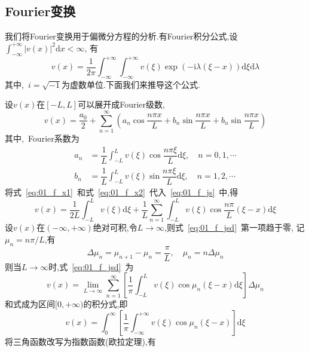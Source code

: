 \documentclass[a4paper,cs4size,adobefonts,fancyhdr]{ctexart}[2005/11/25]
\newcommand{\upcite}[1]{\textsuperscript{\textsuperscript{\cite{#1}}}}
\newcommand{\dif}{\mathrm{d}}
\newcommand*{\mi}{\ensuremath{\mathrm{i}}}        %
\begin{document}
\subsection{Fourier变换}
我们将Fourier变换用于偏微分方程的分析.有Fourier积分公式\upcite{同济大学.计算数学教研室2009},设$\int_{-\infty}^{+\infty}\left|v(x)\right|^2\dif x<\infty$,
有
\begin{equation}\label{eq:01_f}
 v(x)=\dfrac{1}{2\pi}\int_{-\infty}^{+\infty}\int_{-\infty}^{+\infty} v(\xi)\exp(-\mi\lambda(\xi-x))
 \dif\xi\dif\lambda
\end{equation}
其中,~$i=\sqrt{-1}$为虚数单位.下面我们来推导这个公式.\par
设$v(x)$在$[-L,L]$可以展开成Fourier级数,
\begin{equation}\label{eq:01_f_js}
 v(x)=\dfrac{a_0}{2}+\sum_{n=1}^{\infty}\left(a_n\cos\dfrac{n\pi x}{L}+
 b_n\sin\dfrac{n\pi x}{L}+b_n\sin\dfrac{n\pi x}{L}\right)
\end{equation}
其中,~Fourier系数为
\begin{align}
 a_n &=\dfrac{1}{L}\int_{-L}^{L} v(\xi)\cos\dfrac{n\pi\xi}{L}\dif \xi,\quad n=0,1,\cdots \label{eq:01_f_x1}\\
 b_n &=\dfrac{1}{L}\int_{-L}^{L} v(\xi)\sin\dfrac{n\pi\xi}{L}\dif \xi,\quad n=1,2,\cdots \label{eq:01_f_x2}
\end{align}
将式~\eqref{eq:01_f_x1}~和式~\eqref{eq:01_f_x2}~代入~\eqref{eq:01_f_js}~中,得
\begin{equation}\label{eq:01_f_jsd}
 v(x)=\dfrac{1}{2L}\int_{-L}^{L} v(\xi)\dif \xi + \dfrac{1}{L}\sum_{n=1}^{\infty}
      \int_{-L}^{L} v(\xi)\cos\dfrac{n\pi}{L}(\xi-x)\dif\xi
\end{equation}
设$v(x)$在$(-\infty,+\infty)$绝对可积,令$L\to\infty$,则式~\eqref{eq:01_f_jsd}~第一项趋于零,
记$\mu_n=n\pi/L$,有
\begin{equation}
 \Delta\mu_n = \mu_{n+1}-\mu_n =\dfrac{\pi}{L},\quad \mu_n=n\Delta\mu_n
\end{equation}
则当$L\rightarrow\infty$时,式~\eqref{eq:01_f_jsd}~为
\begin{equation*}
 v(x)=\lim_{L\to\infty}\sum_{n=1}^{\infty}\left[\dfrac{1}{\pi}\int_{-L}^{L}
      v(\xi)\cos\mu_n(\xi-x)\dif\xi\right]\Delta\mu_n
\end{equation*}
和式成为区间$[0,+\infty)$的积分式,即
\begin{equation}\label{eq:01_f_jfs}
 v(x)=\int_0^{\infty}\left[\dfrac{1}{\pi}\int_{-\infty}^{+\infty} v(\xi)\cos\mu_n(\xi-x)\right]\dif\xi
\end{equation}
将三角函数改写为指数函数(欧拉定理),有
\end{document}
